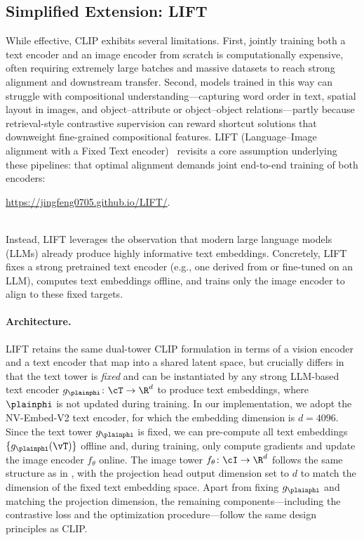 \documentclass[../../book-main.tex]{subfiles}
\begin{document}
\subsection{Simplified Extension: LIFT}\label{sub:follow-up}

While effective, CLIP exhibits several limitations.
First, jointly training both a text encoder and an image encoder from scratch is computationally expensive, often requiring extremely large batches and massive datasets to reach strong alignment and downstream transfer.
Second, models trained in this way can struggle with compositional understanding---capturing word order in text, spatial layout in images, and object--attribute or object--object relations---partly because retrieval-style contrastive supervision can reward shortcut solutions that downweight fine-grained compositional features.
LIFT (Language--Image alignment with a Fixed Text encoder)~\citep{yang2025languageimagealignmentfixedtext} revisits a core assumption underlying these pipelines: that optimal alignment demands joint end-to-end training of both encoders:\\
\centerline{\url{https://jingfeng0705.github.io/LIFT/}.}\\
Instead, LIFT leverages the observation that modern large language models (LLMs) already produce highly informative text embeddings.
Concretely, LIFT fixes a strong pretrained text encoder (e.g., one derived from or fine-tuned on an LLM), computes text embeddings offline, and trains only the image encoder to align to these fixed targets.

\paragraph{Architecture.}
LIFT retains the same dual-tower CLIP formulation in terms of a vision encoder and a text encoder that map into a shared latent space, but crucially differs in that the text tower is \textit{fixed} and can be instantiated by any strong LLM-based text encoder \(g_{\plainphi} \colon \cT \to \R^{d}\) to produce text embeddings, where \(\plainphi\) is not updated during training.
In our implementation, we adopt the NV-Embed-V2 text encoder, for which the embedding dimension is \(d=4096\).
Since the text tower \(g_{\plainphi}\) is fixed, we can pre-compute all text embeddings \(\{g_{\plainphi}(\vT)\}\) offline and, during training, only compute gradients and update the image encoder \(f_{\theta}\) online.
The image tower \(f_{\theta} \colon \cI \to \R^{d}\) follows the same structure as in , with the projection head output dimension set to \(d\) to match the dimension of the fixed text embedding space.
Apart from fixing \(g_{\plainphi}\) and matching the projection dimension, the remaining components---including the contrastive loss and the optimization procedure---follow the same design principles as CLIP.
\end{document}

